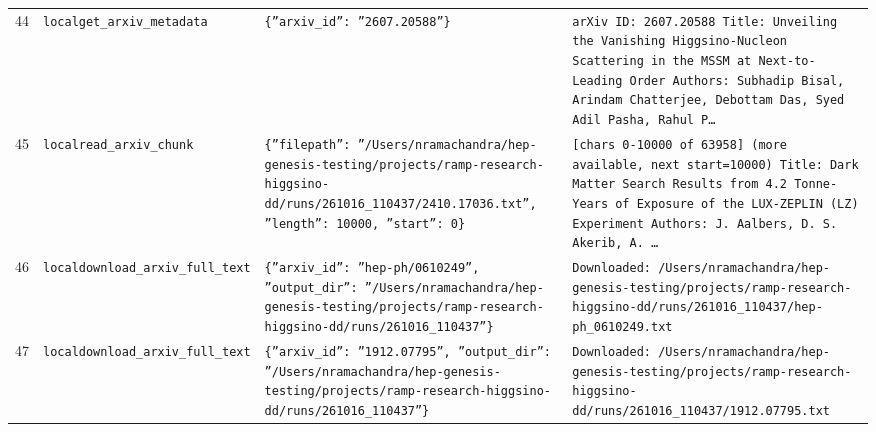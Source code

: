\documentclass[11pt,a4paper]{article}
\begin{document}
\begin{longtable}{@{}p{}p{}p{}p{}@{}}
44 & \texttt{local}\newline\texttt{get\_\allowbreak{}arxiv\_\allowbreak{}metadata} & \texttt{\{''arxiv\_\allowbreak{}id'':\allowbreak{} ''2607.20588''\}\allowbreak{}} & \texttt{arXiv ID:\allowbreak{} 2607.20588 Title:\allowbreak{} Unveiling the Vanishing Higgsino-Nucleon Scattering in the MSSM at Next-to-Leading Order Authors:\allowbreak{} Subhadip Bisal,\allowbreak{} Arindam Chatterjee,\allowbreak{} Debottam Das,\allowbreak{} Syed Adil Pasha,\allowbreak{} Rahul P\ldots{}\allowbreak{}} \\
45 & \texttt{local}\newline\texttt{read\_\allowbreak{}arxiv\_\allowbreak{}chunk} & \texttt{\{''filepath'':\allowbreak{} ''/\allowbreak{}Users/\allowbreak{}nramachandra/\allowbreak{}hep-genesis-testing/\allowbreak{}projects/\allowbreak{}ramp-research-higgsino-dd/\allowbreak{}runs/\allowbreak{}261016\_\allowbreak{}110437/\allowbreak{}2410.17036.txt'',\allowbreak{} ''length'':\allowbreak{} 10000,\allowbreak{} ''start'':\allowbreak{} 0\}\allowbreak{}} & \texttt{[chars 0-10000 of 63958]\allowbreak{} (more available,\allowbreak{} next start=\allowbreak{}10000)\allowbreak{}  Title:\allowbreak{} Dark Matter Search Results from 4.2 Tonne-Years of Exposure of the LUX-ZEPLIN (LZ)\allowbreak{} Experiment Authors:\allowbreak{} J. Aalbers,\allowbreak{} D. S. Akerib,\allowbreak{} A. \ldots{}\allowbreak{}} \\
46 & \texttt{local}\newline\texttt{download\_\allowbreak{}arxiv\_\allowbreak{}full\_\allowbreak{}text} & \texttt{\{''arxiv\_\allowbreak{}id'':\allowbreak{} ''hep-ph/\allowbreak{}0610249'',\allowbreak{} ''output\_\allowbreak{}dir'':\allowbreak{} ''/\allowbreak{}Users/\allowbreak{}nramachandra/\allowbreak{}hep-genesis-testing/\allowbreak{}projects/\allowbreak{}ramp-research-higgsino-dd/\allowbreak{}runs/\allowbreak{}261016\_\allowbreak{}110437''\}\allowbreak{}} & \texttt{Downloaded:\allowbreak{} /\allowbreak{}Users/\allowbreak{}nramachandra/\allowbreak{}hep-genesis-testing/\allowbreak{}projects/\allowbreak{}ramp-research-higgsino-dd/\allowbreak{}runs/\allowbreak{}261016\_\allowbreak{}110437/\allowbreak{}hep-ph\_\allowbreak{}0610249.txt} \\
47 & \texttt{local}\newline\texttt{download\_\allowbreak{}arxiv\_\allowbreak{}full\_\allowbreak{}text} & \texttt{\{''arxiv\_\allowbreak{}id'':\allowbreak{} ''1912.07795'',\allowbreak{} ''output\_\allowbreak{}dir'':\allowbreak{} ''/\allowbreak{}Users/\allowbreak{}nramachandra/\allowbreak{}hep-genesis-testing/\allowbreak{}projects/\allowbreak{}ramp-research-higgsino-dd/\allowbreak{}runs/\allowbreak{}261016\_\allowbreak{}110437''\}\allowbreak{}} & \texttt{Downloaded:\allowbreak{} /\allowbreak{}Users/\allowbreak{}nramachandra/\allowbreak{}hep-genesis-testing/\allowbreak{}projects/\allowbreak{}ramp-research-higgsino-dd/\allowbreak{}runs/\allowbreak{}261016\_\allowbreak{}110437/\allowbreak{}1912.07795.txt} \\

\end{longtable}
\end{document}
